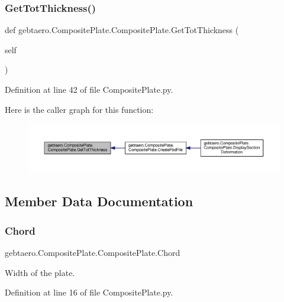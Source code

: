 \subsubsection{\texorpdfstring{Get\+Tot\+Thickness()}{GetTotThickness()}}
{\footnotesize\ttfamily def gebtaero.\+Composite\+Plate.\+Composite\+Plate.\+Get\+Tot\+Thickness (\begin{DoxyParamCaption}\item[{}]{self }\end{DoxyParamCaption})}



Definition at line 42 of file Composite\+Plate.\+py.

Here is the caller graph for this function\+:
\nopagebreak
\begin{figure}[H]
\begin{center}
\leavevmode
\includegraphics[width=350pt]{classgebtaero_1_1_composite_plate_1_1_composite_plate_a093864b1001bc131f474adbd543390c6_icgraph}
\end{center}
\end{figure}


\subsection{Member Data Documentation}
\mbox{\label{classgebtaero_1_1_composite_plate_1_1_composite_plate_a60ae01b006e99e542c3759058e82e4cb}} 
\subsubsection{\texorpdfstring{Chord}{Chord}}
{\footnotesize\ttfamily gebtaero.\+Composite\+Plate.\+Composite\+Plate.\+Chord}



Width of the plate. 



Definition at line 16 of file Composite\+Plate.\+py.

